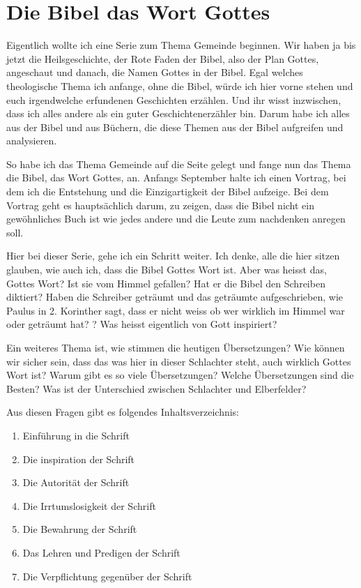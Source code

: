 \section{Die Bibel das Wort Gottes}

Eigentlich wollte ich eine Serie zum Thema Gemeinde beginnen. Wir haben ja bis jetzt die Heilsgeschichte, der Rote Faden der Bibel, also der Plan Gottes, angeschaut und danach, die Namen Gottes in der Bibel. Egal welches theologische Thema ich anfange, ohne die Bibel, würde ich hier vorne stehen und euch irgendwelche erfundenen Geschichten erzählen. Und ihr wisst inzwischen, dass ich alles andere als ein guter Geschichtenerzähler bin. Darum habe ich alles aus der Bibel und aus Büchern, die diese Themen aus der Bibel aufgreifen und analysieren.

So habe ich das Thema Gemeinde auf die Seite gelegt und fange nun das Thema die Bibel, das Wort Gottes, an. Anfangs September halte ich einen Vortrag, bei dem ich die Entstehung und die Einzigartigkeit der Bibel aufzeige. Bei dem Vortrag geht es hauptsächlich darum, zu zeigen, dass die Bibel nicht ein gewöhnliches Buch ist wie jedes andere und die Leute zum nachdenken anregen soll.

Hier bei dieser Serie, gehe ich ein Schritt weiter. Ich denke, alle die hier sitzen glauben, wie auch ich, dass die Bibel Gottes Wort ist. Aber was heisst das, Gottes Wort? Ist sie vom Himmel gefallen? Hat er die Bibel den Schreiben diktiert? Haben die Schreiber geträumt und das geträumte aufgeschrieben, wie Paulus in 2. Korinther sagt, dass er nicht weiss ob wer wirklich im Himmel war oder geträumt hat? ? Was heisst eigentlich von Gott inspiriert? 

Ein weiteres Thema ist, wie stimmen die heutigen Übersetzungen? Wie können wir sicher sein, dass das was hier in dieser Schlachter steht, auch wirklich Gottes Wort ist? Warum gibt es so viele Übersetzungen? Welche Übersetzungen sind die Besten? Was ist der Unterschied zwischen Schlachter und Elberfelder?

Aus diesen Fragen gibt es folgendes Inhaltsverzeichnis:
\begin{enumerate}
    \item Einführung in die Schrift
    \item Die inspiration der Schrift
    \item Die Autorität der Schrift
    \item Die Irrtumslosigkeit der Schrift
    \item Die Bewahrung der Schrift
    \item Das Lehren und Predigen der Schrift
    \item Die Verpflichtung gegenüber der Schrift
\end{enumerate}

